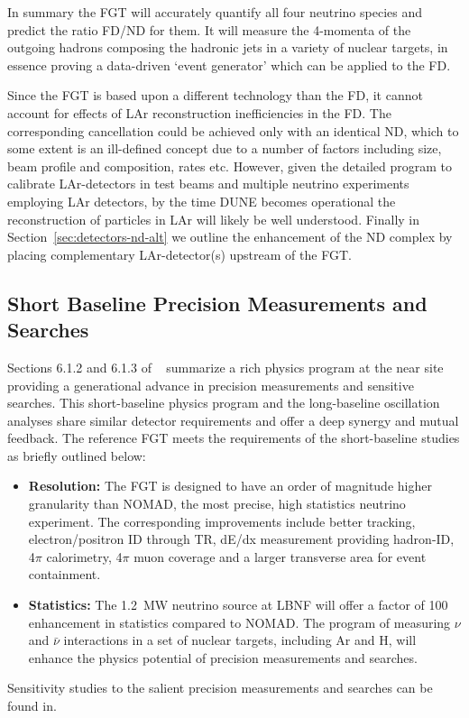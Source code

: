 In summary the FGT will accurately quantify all four neutrino species and
predict the ratio FD/ND for them.  It will measure the 4-momenta of
the outgoing hadrons composing the hadronic jets in a variety of
nuclear targets, in essence proving a data-driven `event generator'
which can be applied to the FD.

Since the FGT is based upon a different technology than the FD, it cannot
account for effects of LAr reconstruction inefficiencies in the
FD. The corresponding cancellation could be achieved only with an
identical ND, which to some extent is an ill-defined concept due to a
number of factors including size, beam profile and composition, rates
etc. However, given the detailed program to calibrate
LAr-detectors in test beams and  multiple neutrino
experiments employing LAr detectors, by the time DUNE becomes
operational the reconstruction of particles in LAr will likely be well
understood. Finally in Section~\ref{sec:detectors-nd-alt} we outline
the enhancement of the ND complex by placing complementary
LAr-detector(s) upstream of the FGT.

\subsection{Short Baseline Precision Measurements and Searches} 
\label{cdrsec:detectors-nd-ref-fgt-req-sbp}


Sections 6.1.2
and 6.1.3 of \volphys\
summarize a rich physics program at the near site providing a
generational advance in precision measurements and sensitive searches.
This short-baseline physics program and the long-baseline oscillation
analyses share similar detector requirements and offer a deep synergy
and mutual feedback.  The reference FGT meets the requirements of the
short-baseline studies as briefly outlined below:
\begin{itemize}
    \item {\bf Resolution:} The FGT is designed to have an order of
      magnitude higher granularity than NOMAD, the most precise, high
      statistics neutrino experiment. The corresponding improvements
      include better tracking, electron/positron ID through TR, dE/dx
      measurement providing hadron-ID, 4$\pi$ calorimetry, 4$\pi$ muon
      coverage and a larger transverse area for event containment.
    \item {\bf Statistics:} The 1.2~MW neutrino source at LBNF will
      offer a factor of 100 enhancement in statistics compared to
      NOMAD. The program of measuring $\nu$ and $\bar\nu$ interactions
      in a set of nuclear targets, including Ar and H, will enhance
      the physics potential of precision measurements and searches.
\end{itemize}
Sensitivity studies to the salient precision measurements and searches
can be found in\cite{Adams:2013qkq, DPR}.


